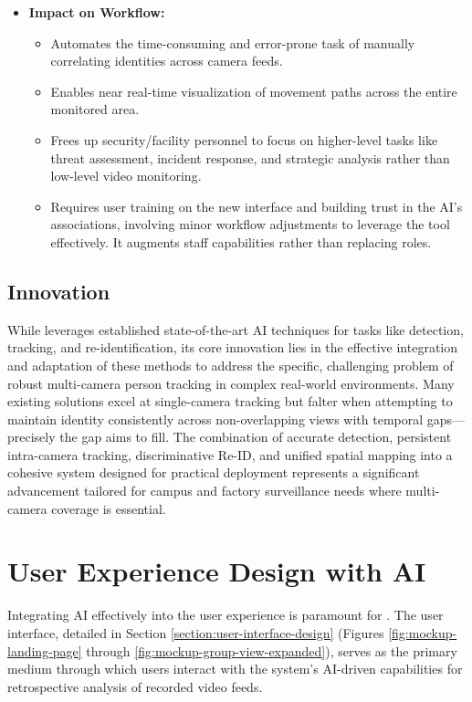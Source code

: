 \begin{itemize}
    \item \textbf{Impact on Workflow:}
        \begin{itemize}
            \item Automates the time-consuming and error-prone task of manually correlating identities across camera feeds.
            \item Enables near real-time visualization of movement paths across the entire monitored area.
            \item Frees up security/facility personnel to focus on higher-level tasks like threat assessment, incident response, and strategic analysis rather than low-level video monitoring.
            \item Requires user training on the new interface and building trust in the AI's associations, involving minor workflow adjustments to leverage the tool effectively. It augments staff capabilities rather than replacing roles.
        \end{itemize}
\end{itemize}


\subsection{Innovation}
\label{subsection:ai-innovation}
While \usevar{\srsTitle} leverages established state-of-the-art AI techniques for tasks like detection, tracking, and re-identification, its core innovation lies in the effective integration and adaptation of these methods to address the specific, challenging problem of robust multi-camera person tracking in complex real-world environments. Many existing solutions excel at single-camera tracking but falter when attempting to maintain identity consistently across non-overlapping views with temporal gaps—precisely the gap \usevar{\srsTitle} aims to fill. The combination of accurate detection, persistent intra-camera tracking, discriminative Re-ID, and unified spatial mapping into a cohesive system designed for practical deployment represents a significant advancement tailored for campus and factory surveillance needs where multi-camera coverage is essential.

\section{User Experience Design with AI}
\label{section:ai-ux}

Integrating AI effectively into the user experience is paramount for \usevar{\srsTitle}. The user interface, detailed in Section \ref{section:user-interface-design} (Figures \ref{fig:mockup-landing-page} through \ref{fig:mockup-group-view-expanded}), serves as the primary medium through which users interact with the system's AI-driven capabilities for retrospective analysis of recorded video feeds.

